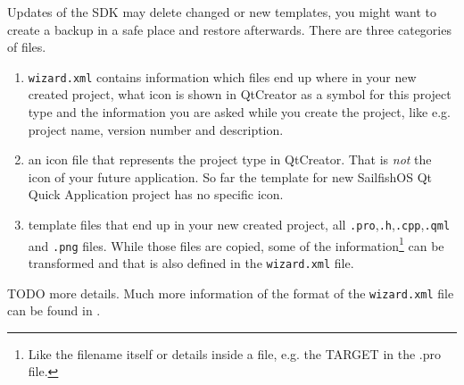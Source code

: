 Updates of the SDK may delete changed or new templates, you might want to create a backup in a safe place and restore afterwards.
There are three categories of files.
\begin{enumerate}
\item \verb,wizard.xml, contains information which files end up where in your new created project, what icon is shown in QtCreator as a symbol for this project type and the information you are asked while you create the project, like e.g. project name, version number and description.
\item an icon file that represents the project type in QtCreator. That is \emph{not} the icon of your future application. So far the template for new SailfishOS Qt Quick Application project has no specific icon. 
\item template files that end up in your new created project, all \verb,.pro,,\verb,.h,,\verb,.cpp,,\verb,.qml, and \verb,.png, files. While those files are copied, some of the information\footnote{Like the filename itself or details inside a file, e.g. the TARGET in the .pro file.} can be transformed and that is also defined in the \verb,wizard.xml, file.
\end{enumerate}
%
TODO more details.
%
Much more information of the format of the \verb,wizard.xml, file can be found in \cite{qt07}.
%
